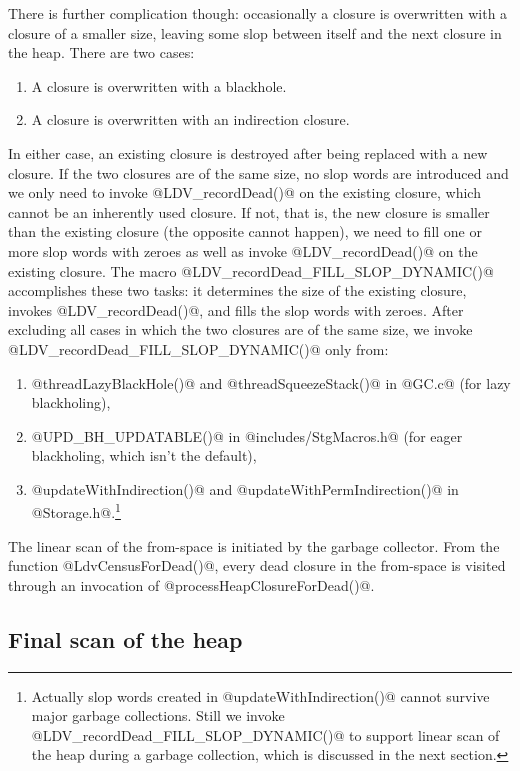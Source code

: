 \documentclass{article}
\begin{document}
There is further complication though: occasionally a closure is
overwritten with a closure of a smaller size, leaving some slop
between itself and the next closure in the heap.  There are two cases:

\begin{enumerate}
\item A closure is overwritten with a blackhole. 
\item A closure is overwritten with an indirection closure.
\end{enumerate}

In either case, an existing closure is destroyed after being replaced
with a new closure.  If the two closures are of the same size, no slop
words are introduced and we only need to invoke @LDV_recordDead()@ on
the existing closure, which cannot be an inherently used closure.  If
not, that is, the new closure is smaller than the existing closure
(the opposite cannot happen), we need to fill one or more slop words
with zeroes as well as invoke @LDV_recordDead()@ on the existing
closure.  The macro @LDV_recordDead_FILL_SLOP_DYNAMIC()@ accomplishes
these two tasks: it determines the size of the existing closure,
invokes @LDV_recordDead()@, and fills the slop words with zeroes.
After excluding all cases in which the two closures are of the same
size, we invoke @LDV_recordDead_FILL_SLOP_DYNAMIC()@ only from:

\begin{enumerate}
\item @threadLazyBlackHole()@ and @threadSqueezeStack()@ in @GC.c@
(for lazy blackholing),
\item @UPD_BH_UPDATABLE()@ in
@includes/StgMacros.h@ (for eager blackholing, which isn't the
default),
\item @updateWithIndirection()@ and @updateWithPermIndirection()@ 
in @Storage.h@.\footnote{Actually slop words created in 
@updateWithIndirection()@ cannot survive major garbage collections.
Still we invoke @LDV\_recordDead\_FILL\_SLOP\_DYNAMIC()@ to support linear
scan of the heap during a garbage collection, which is discussed in the next
section.}
\end{enumerate}

The linear scan of the from-space is initiated by the garbage
collector.  From the function @LdvCensusForDead()@, every dead closure
in the from-space is visited through an invocation of
@processHeapClosureForDead()@.

\subsection{Final scan of the heap}
\end{document}
